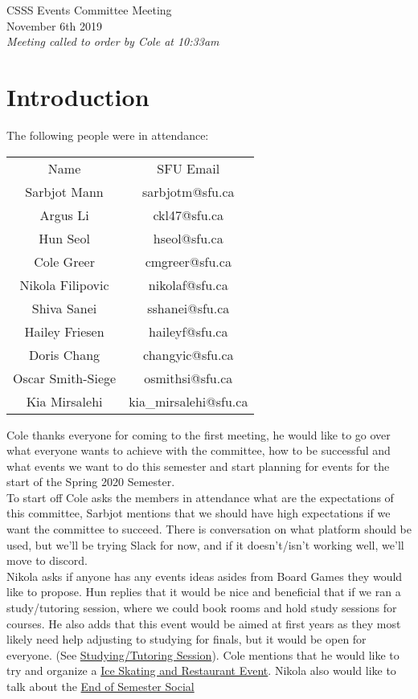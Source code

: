 \documentclass[12pt]{article}
\begin{document}
\begin{center}
CSSS Events Committee Meeting \\
November 6th 2019 \\
\em Meeting called to order by Cole at 10:33am
\end{center}
\tableofcontents

\section{Introduction} \label{sec:Introduction}
The following people were in attendance: 
\begin{table}[h!]
\centering
\begin{tabular}{cc}
Name              & SFU Email        \\
Sarbjot Mann      & sarbjotm@sfu.ca \\
Argus Li          & ckl47@sfu.ca    \\
Hun Seol          & hseol@sfu.ca    \\
Cole Greer        & cmgreer@sfu.ca  \\
Nikola Filipovic  & nikolaf@sfu.ca  \\
Shiva Sanei       & sshanei@sfu.ca  \\
Hailey Friesen    & haileyf@sfu.ca  \\
Doris Chang       & changyic@sfu.ca \\
Oscar Smith-Siege & osmithsi@sfu.ca \\
Kia Mirsalehi     & kia\_mirsalehi@sfu.ca 
\end{tabular}
\end{table}

\noindent Cole thanks everyone for coming to the first meeting, he would like to go over what everyone wants to achieve with the committee, how to be successful and what events we want to do this semester and start planning for events for the start of the Spring 2020 Semester. \\

\noindent To start off Cole asks the members in attendance what are the expectations of this committee, Sarbjot mentions that we should have high expectations if we want the committee to succeed. There is conversation on what platform should be used, but we'll be trying Slack for now, and if it doesn't/isn't working well, we'll move to discord. \\

\noindent Nikola asks if anyone has any events ideas asides from Board Games they would like to propose. Hun replies that it would be nice and beneficial that if we ran a study/tutoring session, where we could book rooms and hold study sessions for courses. He also adds that this event would be aimed at first years as they most likely need help adjusting to studying for finals, but it would be open for everyone. (See \hyperref[sec:Tutor]{Studying/Tutoring Session}). Cole mentions that he would like to try and organize a \hyperref[sec:Skate]{Ice Skating and Restaurant Event}. Nikola also would like to talk about the \hyperref[sec:EoSS]{End of Semester Social}
\end{document}

